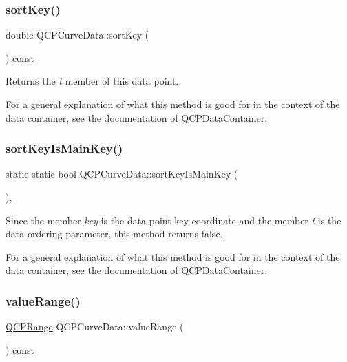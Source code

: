 \subsubsection{\texorpdfstring{sort\+Key()}{sortKey()}}
{\footnotesize\ttfamily double Q\+C\+P\+Curve\+Data\+::sort\+Key (\begin{DoxyParamCaption}{ }\end{DoxyParamCaption}) const\hspace{0.3cm}{\ttfamily [inline]}}

Returns the {\itshape t} member of this data point.

For a general explanation of what this method is good for in the context of the data container, see the documentation of \hyperlink{class_q_c_p_data_container}{Q\+C\+P\+Data\+Container}. \mbox{\label{class_q_c_p_curve_data_a1b78f228e31ca40a1e69add44537918c}} 
\subsubsection{\texorpdfstring{sort\+Key\+Is\+Main\+Key()}{sortKeyIsMainKey()}}
{\footnotesize\ttfamily static static bool Q\+C\+P\+Curve\+Data\+::sort\+Key\+Is\+Main\+Key (\begin{DoxyParamCaption}{ }\end{DoxyParamCaption})\hspace{0.3cm}{\ttfamily [inline]}, {\ttfamily [static]}}

Since the member {\itshape key} is the data point key coordinate and the member {\itshape t} is the data ordering parameter, this method returns false.

For a general explanation of what this method is good for in the context of the data container, see the documentation of \hyperlink{class_q_c_p_data_container}{Q\+C\+P\+Data\+Container}. \mbox{\label{class_q_c_p_curve_data_acf15deffd18d400651f8384a95dad9f8}} 
\subsubsection{\texorpdfstring{value\+Range()}{valueRange()}}
{\footnotesize\ttfamily \hyperlink{class_q_c_p_range}{Q\+C\+P\+Range} Q\+C\+P\+Curve\+Data\+::value\+Range (\begin{DoxyParamCaption}{ }\end{DoxyParamCaption}) const\hspace{0.3cm}{\ttfamily [inline]}}

